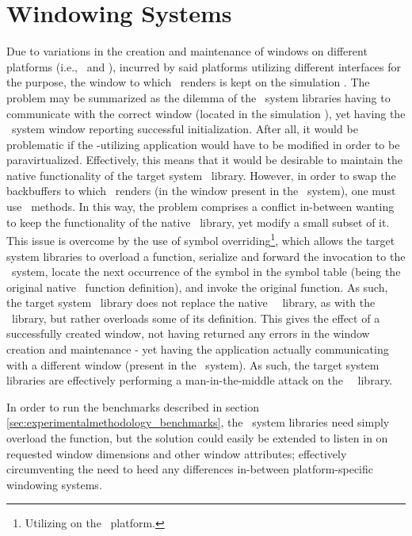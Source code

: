 \section{Windowing Systems}
\label{sec:proposedsolutionandimplementation_windowingsystems}
Due to variations in the creation and maintenance of windows on different platforms (i.e., \dvttermfedora\ and \dvttermandroid ), incurred by said platforms utilizing different interfaces for the purpose, the window to which \dvttermopengl\ renders is kept on the simulation \dvttermhost .
The problem may be summarized as the dilemma of the \dvttermtarget\ system libraries having to communicate with the correct window (located in the simulation \dvttermhost ), yet having the \dvttermtarget\ system window reporting successful initialization.
After all, it would be problematic if the \dvttermopengl -utilizing application would have to be modified in order to be paravirtualized.
Effectively, this means that it would be desirable to maintain the native functionality of the target system \dvttermegl\ library.
However, in order to swap the backbuffers to which \dvttermopengl\ renders (in the window present in the \dvttermhost\ system), one must use \dvttermegl\ methods.
In this way, the problem comprises a conflict in-between wanting to keep the functionality of the native \dvttermegl\ library, yet modify a small subset of it. 
This issue is overcome by the use of symbol overriding\footnote{Utilizing  on the \dvttermlinux\ platform.}, which allows the target system libraries to overload a function, serialize and forward the invocation to the \dvttermhost\ system, locate the next occurrence of the symbol in the symbol table (being the original native \dvttermegl\ function definition), and invoke the original function.
As such, the target system \dvttermegl\ library does not replace the native \dvttermtarget\ \dvttermegl\ library, as with the \dvttermopengl\ library, but rather overloads some of its definition.
This gives the effect of a successfully created window, not having returned any errors in the window creation and maintenance - yet having the application actually communicating with a different window (present in the \dvttermhost\ system).
As such, the target system libraries are effectively performing a man-in-the-middle attack on the \dvttermtarget\ \dvttermegl\ library.

In order to run the benchmarks described in section \ref{sec:experimentalmethodology_benchmarks}, the \dvttermtarget\ system libraries need simply overload the  function, but the solution could easily be extended to listen in on requested window dimensions and other window attributes; effectively circumventing the need to heed any differences in-between platform-specific windowing systems.

